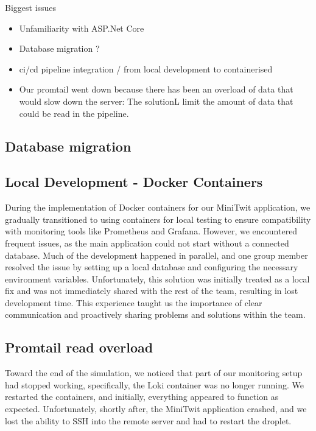 \documentclass[12pt,a4paper,reqno]{report}
\begin{document}

Biggest issues
\begin{itemize}
    \item Unfamiliarity with ASP.Net Core
    \item Database migration ?
    \item ci/cd pipeline integration / from local development to containerised 
    \item Our promtail went down because there has been an overload of data that would slow down the server: The solutionL limit the amount of data that could be read in the pipeline.
\end{itemize}


\subsection{Database migration}

\subsection{Local Development - Docker Containers}
During the implementation of Docker containers for our MiniTwit application, we gradually transitioned to using containers for local testing to ensure compatibility with monitoring tools like Prometheus and Grafana. However, we encountered frequent issues, as the main application could not start without a connected database. Much of the development happened in parallel, and one group member resolved the issue by setting up a local database and configuring the necessary environment variables. Unfortunately, this solution was initially treated as a local fix and was not immediately shared with the rest of the team, resulting in lost development time. This experience taught us the importance of clear communication and proactively sharing problems and solutions within the team.

\subsection{Promtail read overload}
Toward the end of the simulation, we noticed that part of our monitoring setup had stopped working, specifically, the Loki container was no longer running. We restarted the containers, and initially, everything appeared to function as expected. Unfortunately, shortly after, the MiniTwit application crashed, and we lost the ability to SSH into the remote server and had to restart the droplet.
\end{document}
